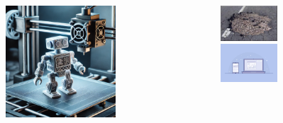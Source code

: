 \documentclass{beamer}
\begin{document}
\begin{frame}
\begin{center}
	\begin{columns}
		\begin{column}{0.5\textwidth}
			\raggedleft
			\includegraphics[width=0.55\textwidth]{figs/impresion.png} \\[5pt]
		\end{column} \hspace{0.5cm}
		\begin{column}{0.5\textwidth}
			\raggedright
			\includegraphics[width=0.4\textwidth]{figs/bache.png} \\[5pt]
			\includegraphics[width=0.4\textwidth]{figs/interfaceweb.png} \\[5pt]
		\end{column}
	\end{columns}
	\end{center}
\end{frame}
\end{document}
